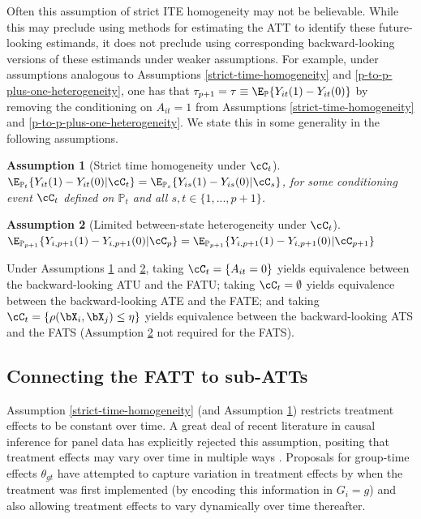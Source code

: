 \documentclass{article}
\newtheorem{assumption}{Assumption}
\renewcommand{\P}{\mathbb{P}}
\begin{document}
    Often this assumption of strict ITE homogeneity may not be believable. While this may preclude using methods for estimating the ATT to identify these future-looking estimands, it does not preclude using corresponding backward-looking versions of these estimands under weaker assumptions. For example, under assumptions analogous to Assumptions \ref{strict-time-homogeneity} and \ref{p-to-p-plus-one-heterogeneity}, one has that $\tau_{p+1} = \tau \equiv \E_\P\{Y_{it}(1) - Y_{it}(0)\}$ by removing the conditioning on $A_{it} = 1$ from Assumptions \ref{strict-time-homogeneity} and \ref{p-to-p-plus-one-heterogeneity}. We state this in some generality in the following assumptions.
\begin{assumption}[Strict time homogeneity under $\cC_t$]
    $\E_{\P_t}\{Y_{it}(1) - Y_{it}(0) | \cC_t\} = \E_{\P_s}\{Y_{is}(1) - Y_{is}(0) | \cC_s\}$, for some conditioning event $\cC_t$ defined on $\P_t$ and all $s, t \in \{1, ..., p+1\}$.\label{general-strict-time-homogeneity}
\end{assumption}
\begin{assumption}[Limited between-state heterogeneity under $\cC_t$]
    $\E_{\P_{p+1}}\{Y_{i,p+1}(1) - Y_{i,p+1}(0) | \cC_p\} = \E_{\P_{p+1}}\{Y_{i,p+1}(1) - Y_{i,p+1}(0) | \cC_{p+1}\}$\label{general-p-to-p-plus-one-heterogeneity}
\end{assumption}
Under Assumptions \ref{general-strict-time-homogeneity} and \ref{general-p-to-p-plus-one-heterogeneity}, taking $\cC_t = \{A_{it} = 0\}$ yields equivalence between the backward-looking ATU and the FATU; taking $\cC_t = \emptyset$ yields equivalence between the backward-looking ATE and the FATE; and taking $\cC_t = \{\rho(\bX_i, \bX_j) \leq \eta\}$ yields equivalence between the backward-looking ATS and the FATS (Assumption \ref{general-p-to-p-plus-one-heterogeneity} not required for the FATS).

\subsection{Connecting the FATT to sub-ATTs}
Assumption \ref{strict-time-homogeneity} (and Assumption \ref{general-strict-time-homogeneity}) restricts treatment effects to be constant over time. A great deal of recent literature in causal inference for panel data has explicitly rejected this assumption, positing that treatment effects may vary over time in multiple ways \citep{sunEstimatingDynamicTreatment2021,brownDynamicTreatmentEffect2025}. Proposals for group-time effects $\theta_{gt}$ have attempted to capture variation in treatment effects by when the treatment was first implemented (by encoding this information in $G_i = g$) and also allowing treatment effects to vary dynamically over time thereafter. 
\end{document}
